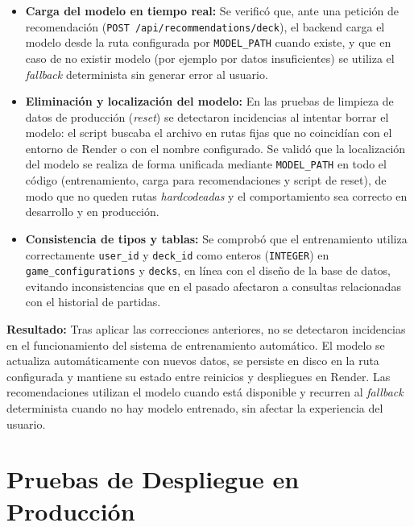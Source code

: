 \begin{itemize}
    \item \textbf{Carga del modelo en tiempo real:} Se verificó que, ante una petición de recomendación (\texttt{POST /api/recommendations/deck}), el backend carga el modelo desde la ruta configurada por \texttt{MODEL\_PATH} cuando existe, y que en caso de no existir modelo (por ejemplo por datos insuficientes) se utiliza el \textit{fallback} determinista sin generar error al usuario.

    \item \textbf{Eliminación y localización del modelo:} En las pruebas de limpieza de datos de producción (\textit{reset}) se detectaron incidencias al intentar borrar el modelo: el script buscaba el archivo en rutas fijas que no coincidían con el entorno de Render o con el nombre configurado. Se validó que la localización del modelo se realiza de forma unificada mediante \texttt{MODEL\_PATH} en todo el código (entrenamiento, carga para recomendaciones y script de reset), de modo que no queden rutas \textit{hardcodeadas} y el comportamiento sea correcto en desarrollo y en producción.

    \item \textbf{Consistencia de tipos y tablas:} Se comprobó que el entrenamiento utiliza correctamente \texttt{user\_id} y \texttt{deck\_id} como enteros (\texttt{INTEGER}) en \texttt{game\_configurations} y \texttt{decks}, en línea con el diseño de la base de datos, evitando inconsistencias que en el pasado afectaron a consultas relacionadas con el historial de partidas.
\end{itemize}

\textbf{Resultado:} Tras aplicar las correcciones anteriores, no se detectaron incidencias en el funcionamiento del sistema de entrenamiento automático. El modelo se actualiza automáticamente con nuevos datos, se persiste en disco en la ruta configurada y mantiene su estado entre reinicios y despliegues en Render. Las recomendaciones utilizan el modelo cuando está disponible y recurren al \textit{fallback} determinista cuando no hay modelo entrenado, sin afectar la experiencia del usuario.

\section{Pruebas de Despliegue en Producción}
\label{sec:despliegue}

